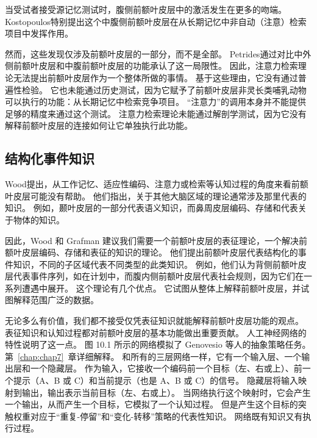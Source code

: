 当受试者接受源记忆测试时，腹侧前额叶皮层中的激活发生在更多的吻端\cite{king2005anterior}。
Kostopoulos\cite{kostopoulos2008left}特别提出这个中腹侧前额叶皮层在从长期记忆中非自动（注意）检索项目中发挥作用。
\par


然而，这些发现仅涉及前额叶皮层的一部分，而不是全部。
Petrides\cite{petrides2005lateral}通过对比中外侧前额叶皮层和中腹前额叶皮层的功能承认了这一局限性。
因此，注意力检索理论无法提出前额叶皮层作为一个整体所做的事情。
基于这些理由，它没有通过普遍性检验。
它也未能通过历史测试，因为它赋予了前额叶皮层非灵长类哺乳动物可以执行的功能：从长期记忆中检索竞争项目。
“注意力”的调用本身并不能提供足够的精度来通过这个测试。
注意力检索理论未能通过解剖学测试，因为它没有解释前额叶皮层的连接如何让它单独执行此功能。



\subsection{结构化事件知识}

Wood\cite{wood2003human}提出，从工作记忆、适应性编码、注意力或检索等认知过程的角度来看前额叶皮层可能没有帮助。
他们指出，关于其他大脑区域的理论通常涉及那里代表的知识。
例如，颞叶皮层的一部分代表语义知识，而鼻周皮层编码、存储和代表关于物体的知识。
\par


因此，Wood 和 Grafman 建议我们需要一个前额叶皮层的表征理论，一个解决前额叶皮层编码、存储和表征的知识的理论。
他们提出前额叶皮层代表结构化的事件知识，不同的子区域代表不同类型的此类知识。
例如，他们认为背侧前额叶皮层代表事件序列，如在计划中，而腹内侧前额叶皮层代表社会规则，因为它们在一系列遭遇中展开。
这个理论有几个优点。
它试图从整体上解释前额叶皮层，并试图解释范围广泛的数据。
\par


无论多么有价值，我们都不接受仅凭表征知识就能解释前额叶皮层功能的观点。
表征知识和认知过程都对前额叶皮层的基本功能做出重要贡献。
人工神经网络的特性说明了这一点。
图 10.1 所示的网络模拟了 Genovesio 等人的抽象策略任务\cite{genovesio2005prefrontal}。
第~\ref{chap:chap7}~章详细解释。
和所有的三层网络一样，它有一个输入层、一个输出层和一个隐藏层。
作为输入，它接收一个编码前一个目标（左、右或上）、前一个提示（A、B 或 C）和当前提示（也是 A、B 或 C）的信号。
隐藏层将输入映射到输出，输出表示当前目标（左、右或上）。
当网络执行这个映射时，它会产生一个输出，从而产生一个目标，它模拟了一个认知过程。
但是产生这个目标的突触权重对应于“重复-停留”和“变化-转移”策略的代表性知识。
网络既有知识又有执行过程。
\par


